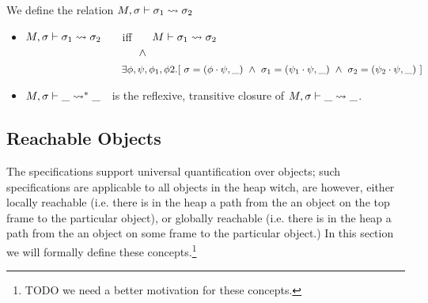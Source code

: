 {
\begin{definition}
\label{def:shallow:term}
We define the relation  $M, \sigma \vdash {\sigma_1} \leadsto \sigma_2$ 

\begin{itemize}
\item
 $M, \sigma \vdash {\sigma_1} \leadsto \sigma_2$ \ \ \ iff \ \ \  $M \vdash \sigma_1 \leadsto {\sigma_2}$\\
$\strut  \hspace{3.6cm} \wedge $\\
$\strut  \hspace{3.1cm}\ \    \exists \phi,\psi, \phi_1, \phi2.[ \ \sigma = (\phi\cdot\psi,\_) \ \wedge \ \sigma_1 = (\psi_1\cdot \psi, \_)
\ \wedge\ \sigma_2 = (\psi_2\cdot \psi, \_)\ ] $ 
\item
 $M, \sigma \vdash {\_} \leadsto^* \_$\ \  is the reflexive, transitive closure of $M, \sigma \vdash {\_} \leadsto \_$.
\end{itemize}
\end{definition}
}
 

  \subsection{{Reachable  Objects}}
  
{The  \SpecLang  specifications support universal quantification over  objects; such specifications 
are applicable  to all objects in the heap witch, are however, either locally reachable (i.e. there is in the heap a path from the an 
object on the top frame to the particular object), or globally reachable (i.e. there is in the heap a path from the an 
object on some frame to the particular object.)
In this section  we will formally define these concepts.}\footnote{TODO we need a better motivation for these concepts.}
 



